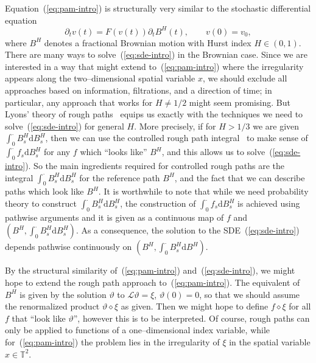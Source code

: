 \documentclass[a4paper,11pt]{article}
\newcommand{\mathd}{\mathrm{d}}
\newcommand{\LL}{\mathscr{L}}
\newcommand{\renorm}{\,\mathord{\diamond}\,}
\begin{document}
Equation~(\ref{eq:pam-intro}) is structurally very similar to the stochastic
differential equation
\begin{equation}
  \label{eq:sde-intro} \partial_t v (t) = F (v (t)) \partial_t B^H (t),
  \hspace{2em} v (0) = v_0,
\end{equation}
where $B^H$ denotes a fractional Brownian motion with Hurst index $H \in (0,
1)$. There are many ways to solve~(\ref{eq:sde-intro}) in the Brownian case.
Since we are interested in a way that might extend to~(\ref{eq:pam-intro})
where the irregularity appears along the two--dimensional spatial variable
$x$, we should exclude all approaches based on information, filtrations, and a
direction of time; in particular, any approach that works for $H \neq 1 / 2$
might seem promising. But Lyons' theory of rough paths~{\cite{Lyons1998}}
equips us exactly with the techniques we need to solve~(\ref{eq:sde-intro})
for general $H$. More precisely, if for $H > 1 / 3$ we are given
$\int_0^{\cdot} B^H_s \mathd B_s^H$, then we can use the controlled rough path
integral~{\cite{Gubinelli2004}} to make sense of $\int_0^{\cdot} f_s \mathd
B^H_s$ for any $f$ which ``looks like'' $B^H$, and this allows us to
solve~(\ref{eq:sde-intro}). So the main ingredients required for controlled
rough paths are the integral $\int_0^{\cdot} B^H_s \mathd B_s^H$ for the
reference path $B^H$, and the fact that we can describe paths which look like
$B^H$. It is worthwhile to note that while we need probability theory to
construct $\int_0^{\cdot} B^H_s \mathd B_s^H$, the construction of
$\int_0^{\cdot} f_s \mathd B^H_s$ is achieved using pathwise arguments and it
is given as a continuous map of $f$ and $\left( B^H, \int_0^{\cdot} B^H_s
\mathd B^H_s \right)$. As a consequence, the solution to the
SDE~(\ref{eq:sde-intro}) depends pathwise continuously on $\left( B^H,
\int_0^{\cdot} B^H_s \mathd B^H \right)$.

By the structural similarity of~(\ref{eq:pam-intro}) and~(\ref{eq:sde-intro}),
we might hope to extend the rough path approach to~(\ref{eq:pam-intro}). The
equivalent of $B^H$ is given by the solution $\vartheta$ to $\LL \vartheta =
\xi$, $\vartheta (0) = 0$, so that we should assume the renormalized product
$\vartheta \renorm \xi$ as given. Then we might hope to define $f \renorm
\xi$ for all $f$ that ``look like $\vartheta$'', however this is to be
interpreted. Of course, rough paths can only be applied to functions of a
one--dimensional index variable, while for~(\ref{eq:pam-intro}) the problem
lies in the irregularity of $\xi$ in the spatial variable $x \in
\mathbb{T}^2$.
\end{document}
